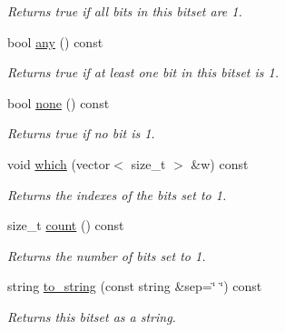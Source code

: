 \begin{DoxyCompactItemize}
\begin{DoxyCompactList}\small\item\em Returns true if all bits in this bitset are 1. \end{DoxyCompactList}\item 
bool \hyperlink{classlgraph_1_1utils_1_1static__bitset_ad0da7d9a48299308d4567bb5199d3f5b}{any} () const \hypertarget{classlgraph_1_1utils_1_1static__bitset_ad0da7d9a48299308d4567bb5199d3f5b}{}\label{classlgraph_1_1utils_1_1static__bitset_ad0da7d9a48299308d4567bb5199d3f5b}

\begin{DoxyCompactList}\small\item\em Returns true if at least one bit in this bitset is 1. \end{DoxyCompactList}\item 
bool \hyperlink{classlgraph_1_1utils_1_1static__bitset_ada662ae7a76fca5dd0fb85e134c17647}{none} () const \hypertarget{classlgraph_1_1utils_1_1static__bitset_ada662ae7a76fca5dd0fb85e134c17647}{}\label{classlgraph_1_1utils_1_1static__bitset_ada662ae7a76fca5dd0fb85e134c17647}

\begin{DoxyCompactList}\small\item\em Returns true if no bit is 1. \end{DoxyCompactList}\item 
void \hyperlink{classlgraph_1_1utils_1_1static__bitset_a53dbca923e8976bbcd23e46dc9691c3c}{which} (vector$<$ size\+\_\+t $>$ \&w) const 
\begin{DoxyCompactList}\small\item\em Returns the indexes of the bits set to 1. \end{DoxyCompactList}\item 
size\+\_\+t \hyperlink{classlgraph_1_1utils_1_1static__bitset_a8d848c930956cd1ec5b378e64dd3e274}{count} () const \hypertarget{classlgraph_1_1utils_1_1static__bitset_a8d848c930956cd1ec5b378e64dd3e274}{}\label{classlgraph_1_1utils_1_1static__bitset_a8d848c930956cd1ec5b378e64dd3e274}

\begin{DoxyCompactList}\small\item\em Returns the number of bits set to 1. \end{DoxyCompactList}\item 
string \hyperlink{classlgraph_1_1utils_1_1static__bitset_a05804b57e80d7f81af80b10e1fcd3cab}{to\+\_\+string} (const string \&sep=\char`\"{} \char`\"{}) const 
\begin{DoxyCompactList}\small\item\em Returns this bitset as a string. \end{DoxyCompactList}\end{DoxyCompactItemize}

